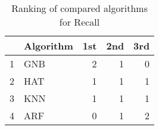 \begin{table}
\footnotesize
\caption{Ranking of compared algorithms for Recall}
\label{tab:places Recall}
\begin{tabular}{llrrr}
\hline
 & Algorithm & 1st & 2nd & 3rd \\
\hline
1 & GNB & 2 & 1 & 0 \\
2 & HAT & 1 & 1 & 1 \\
3 & KNN & 1 & 1 & 1 \\
4 & ARF & 0 & 1 & 2 \\
\hline
\end{tabular}
\end{table}
